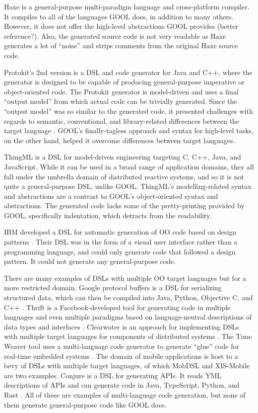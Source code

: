 \documentclass[sigplan,review,anonymous]{acmart}
\begin{document}
Haxe is a general-purpose multi-paradigm language and cross-platform compiler. 
It compiles to all of the languages GOOL does, in addition to many others. 
However, it does not offer the high-level abstractions GOOL provides 
\cite{Haxe} (better reference?). Also, the generated source code is not very 
readable as Haxe generates a lot of ``noise'' and strips comments from the 
original Haxe source code.

Protokit's 2nd version is a DSL and code generator for Java and C++, where the 
generator is designed to be capable of producing general-purpose imperative or 
object-oriented code. The Protokit generator is model-driven and uses a final 
``output model'' from which actual code can be trivially generated. Since the 
``output model'' was so similar to the generated code, it presented challenges 
with regards to semantic, conventional, and library-related differences between 
the target language \cite{kovesdan2017multi}. GOOL's finally-tagless approach 
and syntax for high-level tasks, on the other hand, helped it overcome 
differences between target languages.

ThingML \cite{harrand2016thingml} is a DSL for model-driven engineering 
targeting C, C++, Java, and 
JavaScript. While it can be used in a broad range of application domains, they 
all fall under the umbrella domain of distributed reactive systems, and so it 
is not quite a general-purpose DSL, unlike GOOL. ThingML's modelling-related 
syntax and abstractions are a contrast to GOOL's object-oriented syntax and 
abstractions. The generated code lacks some of the pretty-printing provided by 
GOOL, specifically indentation, which detracts from the readability.

IBM developed a DSL for automatic generation of OO code based on design 
patterns \cite{budinsky1996automatic}. Their DSL was in the form of a visual 
user interface rather than a programming language, and could only generate code 
that followed a design pattern. It could not generate any general-purpose code.

There are many examples of DSLs with multiple OO target languages but for a 
more restricted domain. Google protocol buffers is a DSL for serializing 
structured data, which can then be compiled into Java, Python, Objective C, and 
C++ \cite{Protobuf}. Thrift is a Facebook-developed tool for generating code in 
multiple languages and even multiple paradigms based on language-neutral 
descriptions of data types and interfaces \cite{slee2007thrift}. Clearwater is 
an approach for implementing DSLs with multiple target languages for components 
of distributed systems \cite{swint2005clearwater}. The Time Weaver tool uses a 
multi-language code generator to generate ``glue'' code for real-time embedded 
systems \cite{de2004glue}. The domain of mobile 
applications is host to a bevy of DSLs with multiple target languages, of which 
MobDSL \cite{kramer2010mobdsl} and XIS-Mobile \cite{ribeiro2014xis} are two 
examples. Conjure is a DSL for generating APIs. It reads YML descriptions of 
APIs and can generate code in Java, TypeScript, Python, and Rust 
\cite{Conjure}. All of these are examples of multi-language code generation, 
but none of them generate general-purpose code like GOOL does.
\end{document}
